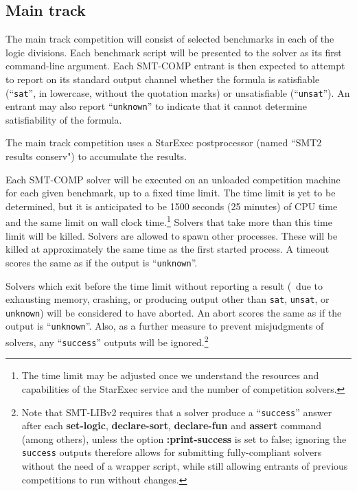 \documentclass[12pt]{article}
\newcommand{\akey}[1]{\textbf{#1}}
\begin{document}
\subsection{Main track}
\label{sec:exec:main}

The main track competition will consist of selected benchmarks in each of the
logic divisions.
Each benchmark script will be presented to the solver as its first command-line argument.
Each SMT-COMP entrant is then expected to attempt to report on its
standard output channel whether the formula is satisfiable
(``\texttt{sat}'', in lowercase, without the quotation marks) or unsatisfiable
(``\texttt{unsat}'').  An entrant may also report ``\texttt{unknown}''
to indicate that it cannot determine satisfiability of the formula.

The main track competition uses a StarExec postprocessor (named ``SMT2 results conserv") to accumulate the results.

Each SMT-COMP solver will be executed on an
unloaded competition machine for each given benchmark, up to a fixed
time limit.  The time limit is yet to be determined, but it is
anticipated to be 1500 seconds (25 minutes) of CPU time and the same limit on wall clock time.\footnote{The time limit may be adjusted once we understand the resources and capabilities of the StarExec service and the number of competition solvers.} 
Solvers that take more than this
time limit will be killed.  Solvers are allowed to spawn other
processes.  These will be killed at approximately the same time as the
first started process.  A
timeout scores the same as if the output is ``\texttt{unknown}''.


Solvers which exit before the time
limit without reporting a result (\ie\ due to exhausting memory, crashing,
or producing output other than \texttt{sat}, \texttt{unsat}, or
\texttt{unknown})
will be considered to have aborted. 
An abort scores the same as if the output is ``\texttt{unknown}''. 
Also, as a further measure to prevent misjudgments of solvers,
any  ``\texttt{success}'' outputs will be 
ignored.\footnote{
Note that SMT-LIBv2 requires that a solver produce a ``\texttt{success}'' answer
after each \akey{set-logic}, \akey{declare-sort}, \akey{declare-fun} and
\akey{assert} command (among others), unless the option
\akey{:print-success} is set to false; ignoring the
\texttt{success} outputs therefore allows for submitting fully-compliant
solvers without the need of a wrapper script, while still allowing entrants
of previous competitions to run without changes.}
\end{document}
